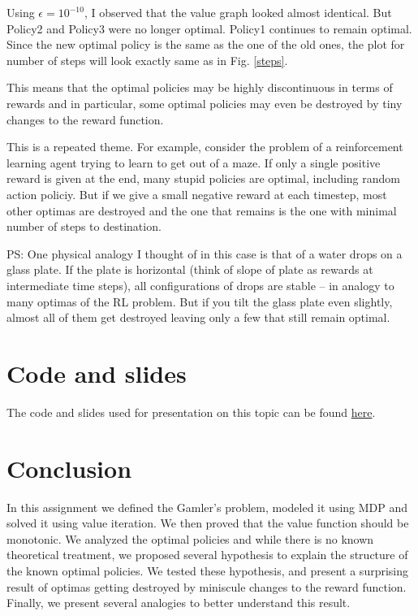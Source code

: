 \documentclass{article}
\begin{document}
Using $\epsilon = 10^{-10}$, I observed that the value graph looked almost identical. But Policy2 and Policy3 were no longer optimal. Policy1 continues to remain optimal. Since the new optimal policy is the same as the one of the old ones, the plot for number of steps will look exactly same as in Fig. \ref{steps}.

This means that the optimal policies may be highly discontinuous in terms of rewards and in particular, some optimal policies may even be destroyed by tiny changes to the reward function.

This is a repeated theme. For example, consider the problem of a reinforcement learning agent trying to learn to get out of a maze. If only a single positive reward is given at the end, many stupid policies are optimal, including random action policiy. But if we give a small negative reward at each timestep, most other optimas are destroyed and the one that remains is the one with minimal number of steps to destination.

PS: One physical analogy I thought of in this case is that of a water drops on a glass plate. If the plate is horizontal (think of slope of plate as rewards at intermediate time steps), all configurations of drops are stable -- in analogy to many optimas of the RL problem. But if you tilt the glass plate even slightly, almost all of them get destroyed leaving only a few that still remain optimal.

\section{Code and slides}
The code and slides used for presentation on this topic can be found \href{https://github.com/AshishBora/reinforcement-learning/tree/master/gamblers_problem}{here}.

\section{Conclusion}
In this assignment we defined the Gamler's problem, modeled it using MDP and solved it using value iteration. We then proved that the value function should be monotonic. We analyzed the optimal policies and while there is no known theoretical treatment, we proposed several hypothesis to explain the structure of the known optimal policies. We tested these hypothesis, and present a surprising result of optimas getting destroyed by miniscule changes to the reward function. Finally, we present several analogies to better understand this result.
\end{document}
